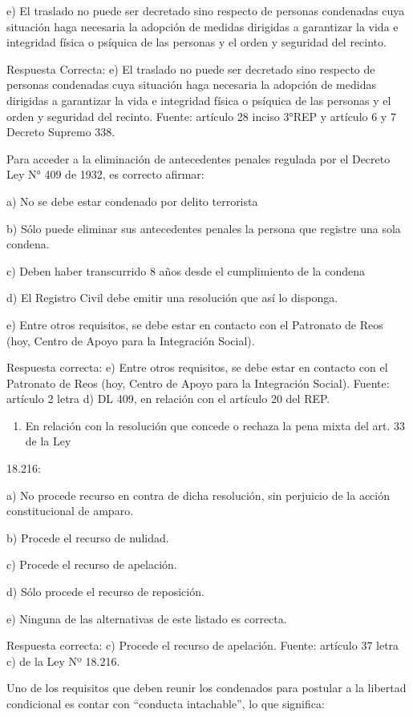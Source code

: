 \documentclass[letterpaper, 11pt]{article}
\begin{document}
e) El traslado no puede ser decretado sino respecto de personas condenadas cuya situación
haga necesaria la adopción de medidas dirigidas a garantizar la vida e integridad física o
psíquica de las personas y el orden y seguridad del recinto.

Respuesta Correcta:
e) El traslado no puede ser decretado sino respecto de personas
condenadas cuya situación haga necesaria la adopción de medidas dirigidas a garantizar
la vida e integridad física o psíquica de las personas y el orden y seguridad del recinto.
Fuente: artículo 28 inciso 3°REP y artículo 6 y 7 Decreto Supremo 338.

Para acceder a la eliminación de antecedentes penales regulada por el Decreto Ley N°
409 de 1932, es correcto afirmar:

a) No se debe estar condenado por delito terrorista

b) Sólo puede eliminar sus antecedentes penales la persona que registre una sola condena.

c) Deben haber transcurrido 8 años desde el cumplimiento de la condena

d) El Registro Civil debe emitir una resolución que así lo disponga.

e) Entre otros requisitos, se debe estar en contacto con el Patronato de Reos (hoy, Centro
de Apoyo para la Integración Social).

Respuesta correcta:
e) Entre otros requisitos, se debe estar en contacto con el Patronato
de Reos (hoy, Centro de Apoyo para la Integración Social).
Fuente: artículo 2 letra d) DL 409, en relación con el artículo 20 del REP.
\begin{enumerate}
\item En relación con la resolución que concede o rechaza la pena mixta del art. 33 de la Ley
\end{enumerate}
18.216:

a) No procede recurso en contra de dicha resolución, sin perjuicio de la acción constitucional
de amparo.

b) Procede el recurso de nulidad.

c) Procede el recurso de apelación.

d) Sólo procede el recurso de reposición.

e) Ninguna de las alternativas de este listado es correcta.

Respuesta correcta:
c) Procede el recurso de apelación.
Fuente: artículo 37 letra c) de la Ley Nº 18.216.

Uno de los requisitos que deben reunir los condenados para postular a la libertad
condicional es contar con “conducta intachable”, lo que significa:
\end{document}
